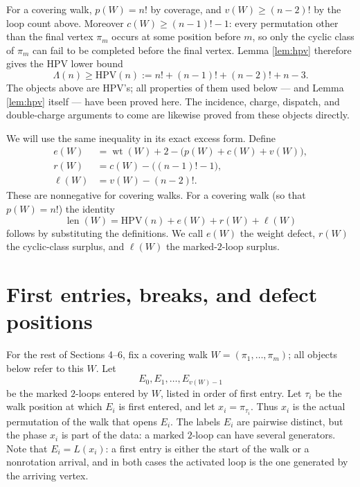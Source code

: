 \documentclass[11pt]{article}
\DeclareMathOperator{\wt}{wt}
\DeclareMathOperator{\len}{len}
\newcommand{\HPV}{\mathrm{HPV}}
\begin{document}
For a covering walk, \(p(W)=n!\) by coverage, and \(v(W)\ge (n-2)!\) by the loop count above.
Moreover \(c(W)\ge (n-1)!-1\): every permutation other than the final vertex \(\pi_m\) occurs at
some position before \(m\), so only the cyclic class of \(\pi_m\) can fail to be completed before
the final vertex.  Lemma
\ref{lem:hpv} therefore gives the HPV lower bound
\[
  \Lambda(n)\ge \HPV(n):=n!+(n-1)!+(n-2)!+n-3.
\]
The objects above are HPV's; all properties of them used below --- and Lemma \ref{lem:hpv}
itself --- have been proved here.  The incidence, charge, dispatch, and double-charge
arguments to come are likewise proved from these objects directly.

We will use the same inequality in its exact excess form.  Define
\[
\begin{aligned}
  e(W)&=\wt(W)+2-\bigl(p(W)+c(W)+v(W)\bigr),\\
  r(W)&=c(W)-\bigl((n-1)!-1\bigr),\\
  \ell(W)&=v(W)-(n-2)!.
\end{aligned}
\]
These are nonnegative for covering walks.  For a covering walk (so that \(p(W)=n!\)) the identity
\[
  \len(W)=\HPV(n)+e(W)+r(W)+\ell(W) \tag{2}
\]
follows by substituting the definitions.  We call \(e(W)\) the weight defect, \(r(W)\) the cyclic-class
surplus, and \(\ell(W)\) the marked-\(2\)-loop surplus.

\section{First entries, breaks, and defect positions}

For the rest of Sections 4--6, fix a covering walk \(W=(\pi_1,\ldots,\pi_m)\); all objects below
refer to this \(W\).  Let
\[
  E_0,E_1,\ldots,E_{v(W)-1}
\]
be the marked \(2\)-loops entered by \(W\), listed in order of first entry.  Let \(\tau_i\) be the walk
position at which \(E_i\) is first entered, and let \(x_i=\pi_{\tau_i}\).  Thus \(x_i\) is the
actual permutation of the walk that opens \(E_i\).  The labels \(E_i\) are pairwise distinct, but
the phase \(x_i\) is part of the data: a marked \(2\)-loop can have several generators.  Note
that \(E_i=L(x_i)\): a first entry is either the start of the walk or a nonrotation arrival, and
in both cases the activated loop is the one generated by the arriving vertex.
\end{document}
